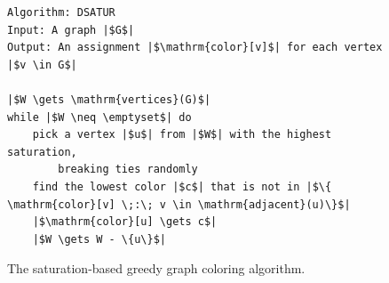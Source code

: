 \documentclass[7x10]{TimesAPriori_MIT}%
\numberwithin{theorem}{chapter}
\numberwithin{definition}{chapter}
\numberwithin{equation}{chapter}
\begin{document}
\begin{figure}[btp]
\begin{tcolorbox}[colback=white]
  \centering
\begin{lstlisting}[basicstyle=\rmfamily,deletekeywords={for,from,with,is,not,in,find},morekeywords={while},columns=fullflexible]
Algorithm: DSATUR
Input: A graph |$G$|
Output: An assignment |$\mathrm{color}[v]$| for each vertex |$v \in G$|

|$W \gets \mathrm{vertices}(G)$|
while |$W \neq \emptyset$| do
    pick a vertex |$u$| from |$W$| with the highest saturation,
        breaking ties randomly
    find the lowest color |$c$| that is not in |$\{ \mathrm{color}[v] \;:\; v \in \mathrm{adjacent}(u)\}$|
    |$\mathrm{color}[u] \gets c$|
    |$W \gets W - \{u\}$|
\end{lstlisting}
\end{tcolorbox}
\caption{The saturation-based greedy graph coloring algorithm.}
  \label{fig:satur-algo}
\end{figure}
\end{document}
